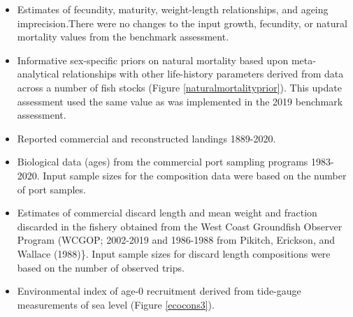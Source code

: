 \documentclass[11pt,
  english,
  a4paper,
]{article}
\begin{document}
\leavevmode\tagmcend\tagstructend\par


\begin{itemize}
\item

  Estimates of fecundity, maturity, weight-length relationships, and ageing imprecision.There were no changes to the input growth, fecundity, or natural mortality values from the benchmark assessment.

  \leavevmode\tagmcend\tagstructend\par
\item

  Informative sex-specific priors on natural mortality based upon meta-analytical relationships with other life-history parameters derived from data across a number of fish stocks (Figure \ref{naturalmortalityprior}). This update assessment used the same value as was implemented in the 2019 benchmark assessment.

  \leavevmode\tagmcend\tagstructend\par
\item

  Reported commercial and reconstructed landings 1889-2020.

  \leavevmode\tagmcend\tagstructend\par
\item

  Biological data (ages) from the commercial port sampling programs 1983-2020. Input sample sizes for the composition data were based on the number of port samples.

  \leavevmode\tagmcend\tagstructend\par
\item

  Estimates of commercial discard length and mean weight and fraction discarded in the fishery obtained from the West Coast Groundfish Observer Program (WCGOP; 2002-2019 and 1986-1988 from {Pikitch, Erickson, and Wallace (1988)\leavevmode\tagmcend\tagstructend}\}. Input sample sizes for discard length compositions were based on the number of observed trips.

  \leavevmode\tagmcend\tagstructend\par
\item

  Environmental index of age-0 recruitment derived from tide-gauge measurements of sea level (Figure \ref{ecocons3}).

  \leavevmode\tagmcend\tagstructend\par
\end{itemize}
\end{document}
